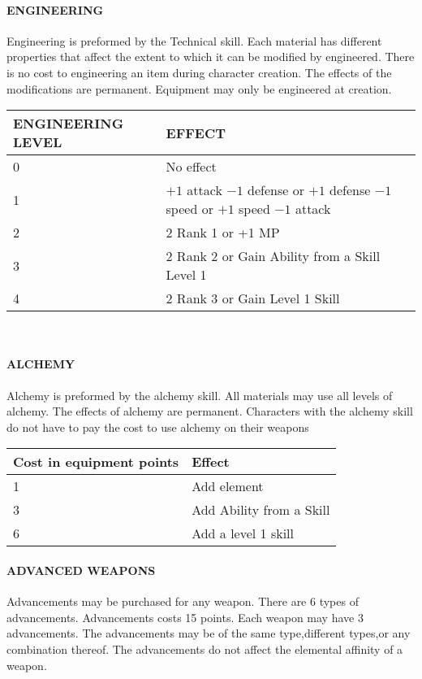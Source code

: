 \paragraph{ENGINEERING}

Engineering is preformed by the Technical skill.  Each material has different
properties that affect the extent to which it can be modified by engineered.
There is no cost to engineering an item during character creation.  The effects
of the modifications are permanent.  Equipment may only be engineered at
creation.\\
\begin{center}
\begin{tabularx}{\textwidth}{X X}
\hline
ENGINEERING LEVEL & EFFECT \\

\hline0 & No effect \\
1 & $+1$ attack $-1$ defense or $+1$ defense $-1$ speed or $+1$ speed $-1$ attack \\
2 & 2 Rank 1 or +1 MP \\
3 & 2 Rank 2 or Gain Ability from a Skill Level 1\\
4 & 2 Rank 3 or Gain Level 1 Skill \\
\hline
\end{tabularx}\\
\end{center}

\paragraph{ALCHEMY}
Alchemy is preformed by the alchemy skill.  All materials may use all levels of
alchemy.  The effects of alchemy are permanent.  Characters with the alchemy
skill do not have to pay the cost to use alchemy on their weapons
\begin{center}
\begin{tabularx}{\textwidth}{X X}
\hline 
Cost in equipment points &Effect\\
\hline 1 & Add element\\
3 & Add Ability from a Skill\\
6 & Add a level 1 skill \\
\hline
\end{tabularx}
\end{center}

\paragraph{ADVANCED WEAPONS}
Advancements may be purchased for any weapon.  There are 6 types of
advancements.  Advancements costs 15 points.  Each weapon may have 3
advancements.  The advancements may be of the same type,different types,or any
combination thereof.  The advancements do not affect the elemental affinity of
a weapon.


